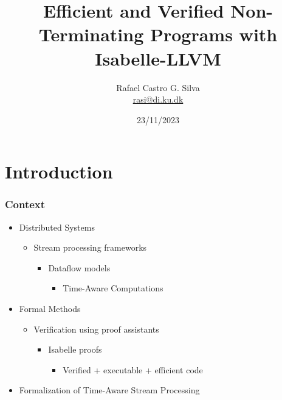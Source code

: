 \documentclass[aspectratio=169,10pt]{beamer}
\title[Efficient and Verified Non-Terminating Programs with Isabelle-LLVM]{Efficient and Verified Non-Terminating Programs with Isabelle-LLVM}
\author[Rafael Castro]{
  Rafael Castro G. Silva\\\medskip
  {\small \url{rasi@di.ku.dk}}}
\date{23/11/2023}
\institute[UCPH]{
  Department of Computer Science \\
  University of Copenhagen}
\begin{document}

\begin{frame}
  \titlepage

\end{frame}

\section{Introduction}

\begin{frame}[fragile]
  \frametitle{Context}
  \begin{itemize}
          \pause
    \item Distributed Systems
          \begin{itemize}
            \item Stream processing frameworks
                  \begin{itemize}
                    \item Dataflow models
                          \begin{itemize}
                            \item Time-Aware Computations
                          \end{itemize}
                  \end{itemize}
          \end{itemize}
          \pause
    \item Formal Methods
          \begin{itemize}
            \item Verification using proof assistants
                  \begin{itemize}
                    \item Isabelle proofs
                          \begin{itemize}
                            \item Verified + executable + efficient code
                          \end{itemize}
                  \end{itemize}
          \end{itemize}
    \item Formalization of Time-Aware Stream Processing
  \end{itemize}
\end{frame}
\end{document}

